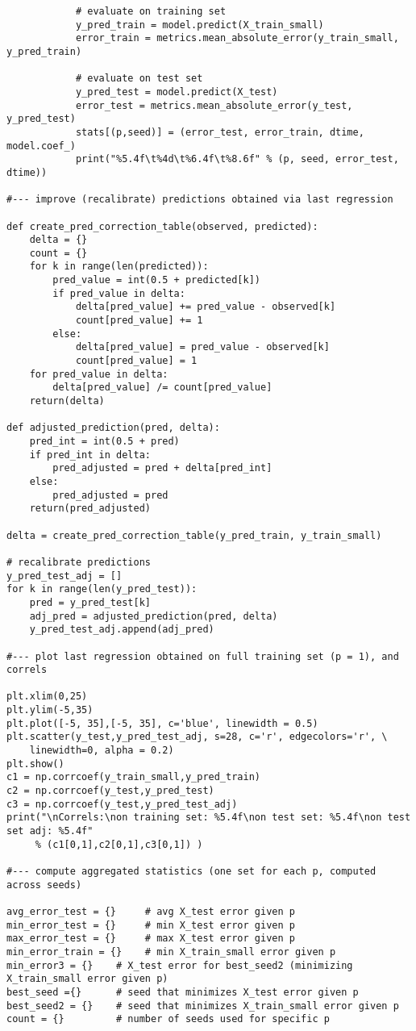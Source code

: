\documentclass[oneside,10pt]{book}
\begin{document}
\begin{lstlisting}
            # evaluate on training set
            y_pred_train = model.predict(X_train_small)
            error_train = metrics.mean_absolute_error(y_train_small, y_pred_train)

            # evaluate on test set
            y_pred_test = model.predict(X_test)
            error_test = metrics.mean_absolute_error(y_test, y_pred_test)
            stats[(p,seed)] = (error_test, error_train, dtime, model.coef_)
            print("%5.4f\t%4d\t%6.4f\t%8.6f" % (p, seed, error_test, dtime))

#--- improve (recalibrate) predictions obtained via last regression

def create_pred_correction_table(observed, predicted):
    delta = {}
    count = {}
    for k in range(len(predicted)):
        pred_value = int(0.5 + predicted[k])
        if pred_value in delta:
            delta[pred_value] += pred_value - observed[k]
            count[pred_value] += 1
        else:
            delta[pred_value] = pred_value - observed[k]
            count[pred_value] = 1
    for pred_value in delta:
        delta[pred_value] /= count[pred_value]
    return(delta)

def adjusted_prediction(pred, delta):
    pred_int = int(0.5 + pred)
    if pred_int in delta: 
        pred_adjusted = pred + delta[pred_int]
    else:
        pred_adjusted = pred
    return(pred_adjusted)

delta = create_pred_correction_table(y_pred_train, y_train_small)

# recalibrate predictions
y_pred_test_adj = []
for k in range(len(y_pred_test)):
    pred = y_pred_test[k]
    adj_pred = adjusted_prediction(pred, delta)
    y_pred_test_adj.append(adj_pred)

#--- plot last regression obtained on full training set (p = 1), and correls

plt.xlim(0,25)
plt.ylim(-5,35)
plt.plot([-5, 35],[-5, 35], c='blue', linewidth = 0.5)
plt.scatter(y_test,y_pred_test_adj, s=28, c='r', edgecolors='r', \
    linewidth=0, alpha = 0.2) 
plt.show()
c1 = np.corrcoef(y_train_small,y_pred_train)
c2 = np.corrcoef(y_test,y_pred_test)
c3 = np.corrcoef(y_test,y_pred_test_adj)
print("\nCorrels:\non training set: %5.4f\non test set: %5.4f\non test set adj: %5.4f" 
     % (c1[0,1],c2[0,1],c3[0,1]) )        

#--- compute aggregated statistics (one set for each p, computed across seeds)

avg_error_test = {}     # avg X_test error given p
min_error_test = {}     # min X_test error given p
max_error_test = {}     # max X_test error given p
min_error_train = {}    # min X_train_small error given p
min_error3 = {}    # X_test error for best_seed2 (minimizing X_train_small error given p)
best_seed ={}      # seed that minimizes X_test error given p
best_seed2 = {}    # seed that minimizes X_train_small error given p
count = {}         # number of seeds used for specific p


\end{lstlisting}
\end{document}
